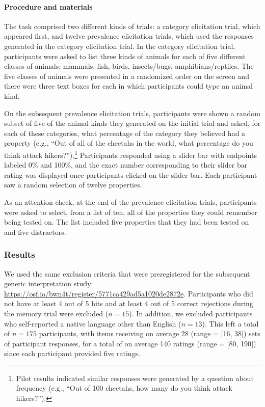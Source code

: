 \documentclass[floatsintext,doc]{apa6}
\let\oldparagraph\paragraph
\renewcommand{\paragraph}[1]{\oldparagraph{#1}\mbox{}}
\let\rmarkdownfootnote\footnote%
\def\footnote{\protect\rmarkdownfootnote}
\begin{document}
\hypertarget{procedure-and-materials-1}{%
\paragraph{Procedure and materials}\label{procedure-and-materials-1}}
The task comprised two different kinds of trials: a category elicitation trial, which appeared first, and twelve prevalence elicitation trials, which used the responses generated in the category elicitation trial.
In the category elicitation trial, participants were asked to list three kinds of animals for each of five different classes of animals: mammals, fish, birds, insects/bugs, amphibians/reptiles.
The five classes of animals were presented in a randomized order on the screen and there were three text boxes for each in which participants could type an animal kind.

On the subsequent prevalence elicitation trials, participants were shown a random subset of five of the animal kinds they generated on the initial trial and asked, for each of these categories, what percentage of the category they believed had a property (e.g., \enquote{Out of all of the cheetahs in the world, what percentage do you think attack hikers?}).\footnote{Pilot results indicated similar responses were generated by a question about frequency (e.g., \enquote{Out of 100 cheetahs, how many do you think attack hikers?}).} 
Participants responded using a slider bar with endpoints labeled 0\% and 100\%, and the exact number corresponding to their slider bar rating was displayed once participants clicked on the slider bar.
Each participant saw a random selection of twelve properties.

As an attention check, at the end of the prevalence elicitation trials, participants were asked to select, from a list of ten, all of the properties they could remember being tested on.
The list included five properties that they had been tested on and five distractors.

\hypertarget{results}{%
\subsubsection{Results}\label{results}}
We used the same exclusion criteria that were preregistered for the subsequent generic interpretation study: \url{https://osf.io/bwn4t/register/5771ca429ad5a1020de2872e}.
Participants who did not have at least 4 out of 5 hits and at least 4 out of 5 correct rejections during the memory trial were excluded (\(n = 15\)).
In addition, we excluded participants who self-reported a native language other than English (\(n = 13\)).
This left a total of \(n = 175\) participants, with items receiving on average 28 (range = {[}16, 38{]}) sets of participant responses, for a total of on average 140 ratings (range = {[}80, 190{]}) since each participant provided five ratings.
\end{document}
